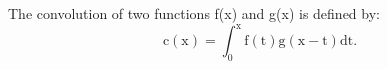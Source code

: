 The convolution of two functions f(x) and g(x) is defined by:
\[ \mathrm{c(x)} = \int _0 ^{\mathrm{x}} \mathrm{f(t)g(x-t)dt} . \]